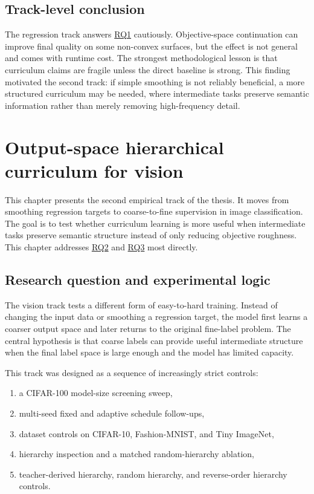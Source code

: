 \documentclass[english,master,a4paper,oneside]{ppfcmthesis}
\begin{document}
\section{Track-level conclusion}

The regression track answers \hyperref[rq:continuation]{RQ1} cautiously. Objective-space continuation can
improve final quality on some non-convex surfaces, but the effect is not general
and comes with runtime cost. The strongest methodological lesson is that
curriculum claims are fragile unless the direct baseline is strong. This finding
motivated the second track: if simple smoothing is not reliably beneficial, a
more structured curriculum may be needed, where intermediate tasks preserve
semantic information rather than merely removing high-frequency detail.


\chapter{Output-space hierarchical curriculum for vision}
\label{chap:vision-curriculum}

This chapter presents the second empirical track of the thesis. It moves from
smoothing regression targets to coarse-to-fine supervision in image
classification. The goal is to test whether curriculum learning is more useful
when intermediate tasks preserve semantic structure instead of only reducing
objective roughness. This chapter addresses \hyperref[rq:vision]{RQ2} and
\hyperref[rq:adaptive]{RQ3} most directly.

\section{Research question and experimental logic}

The vision track tests a different form of easy-to-hard training. Instead of
changing the input data or smoothing a regression target, the model first learns
a coarser output space and later returns to the original fine-label problem. The
central hypothesis is that coarse labels can provide useful intermediate
structure when the final label space is large enough and the model has limited
capacity.

This track was designed as a sequence of increasingly strict controls:

\begin{enumerate}
    \item a CIFAR-100 model-size screening sweep,
    \item multi-seed fixed and adaptive schedule follow-ups,
    \item dataset controls on CIFAR-10, Fashion-MNIST, and Tiny ImageNet,
    \item hierarchy inspection and a matched random-hierarchy ablation,
    \item teacher-derived hierarchy, random hierarchy, and reverse-order
          hierarchy controls.
\end{enumerate}
\end{document}
